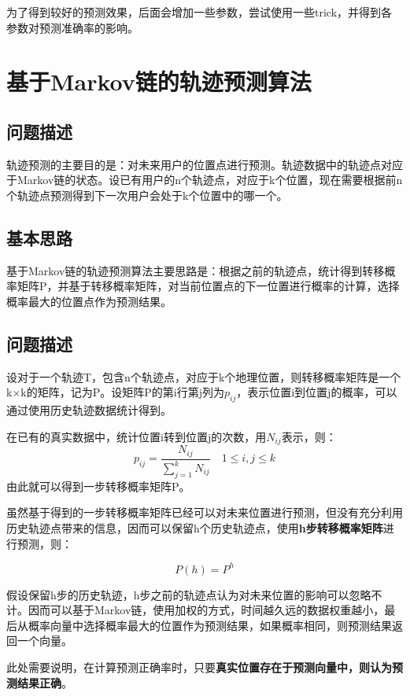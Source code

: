 \documentclass[11pt,twocolumn]{article}
\begin{document}
为了得到较好的预测效果，后面会增加一些参数，尝试使用一些trick，并得到各参数对预测准确率的影响。

\section{基于Markov链的轨迹预测算法}
\subsection{问题描述}
轨迹预测的主要目的是：对未来用户的位置点进行预测。轨迹数据中的轨迹点对应于Markov链的状态。设已有用户的n个轨迹点，对应于k个位置，现在需要根据前n个轨迹点预测得到下一次用户会处于k个位置中的哪一个。

\subsection{基本思路}
基于Markov链的轨迹预测算法主要思路是：根据之前的轨迹点，统计得到转移概率矩阵P，并基于转移概率矩阵，对当前位置点的下一位置进行概率的计算，选择概率最大的位置点作为预测结果。

\subsection{问题描述}
设对于一个轨迹T，包含n个轨迹点，对应于k个地理位置，则转移概率矩阵是一个k$\times$k的矩阵，记为P。设矩阵P的第i行第j列为$p_{ij}$，表示位置i到位置j的概率，可以通过使用历史轨迹数据统计得到。

在已有的真实数据中，统计位置i转到位置j的次数，用$N_{ij}$表示，则：
\begin{equation}
	p_{ij} = \frac{N_{ij}}{\sum_{j=1}^{k}N_{ij}}  \quad 1\leq i, j\leq k
\end{equation}
由此就可以得到一步转移概率矩阵P。

虽然基于得到的一步转移概率矩阵已经可以对未来位置进行预测，但没有充分利用历史轨迹点带来的信息，因而可以保留h个历史轨迹点，使用\textbf{h步转移概率矩阵}进行预测，则：

\begin{equation}
	P(h)= P^{h}
\end{equation}

假设保留h步的历史轨迹，h步之前的轨迹点认为对未来位置的影响可以忽略不计。因而可以基于Markov链，使用加权的方式，时间越久远的数据权重越小，最后从概率向量中选择概率最大的位置作为预测结果，如果概率相同，则预测结果返回一个向量。

此处需要说明，在计算预测正确率时，只要\textbf{真实位置存在于预测向量中，则认为预测结果正确}。
\end{document}
